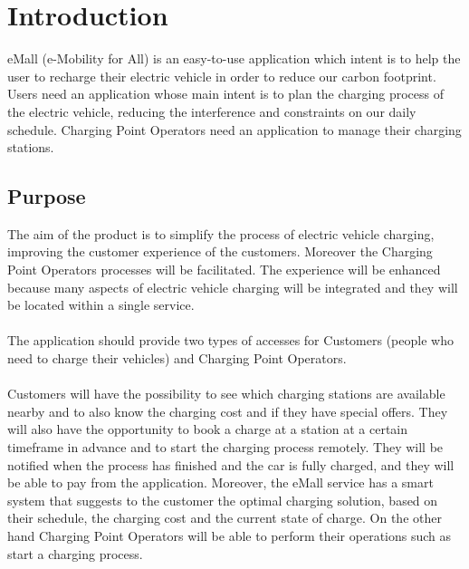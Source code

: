 \section{Introduction}
eMall (e-Mobility for All) is an easy-to-use application which intent is to help the user to recharge their electric vehicle in order to reduce our carbon footprint.
Users need an application whose main intent is to plan the charging process of the electric vehicle, reducing the interference and constraints on our daily schedule.
Charging Point Operators need an application to manage their charging stations. 
\subsection{Purpose}

The aim of the product is to simplify the process of electric vehicle charging, improving the customer experience of the customers. Moreover the Charging Point Operators processes will be facilitated.
The experience will be enhanced because many aspects of electric vehicle charging will be integrated and they will be located within a single service.
\\\\
The application should provide two types of accesses for Customers (people who need to charge their vehicles) and Charging Point Operators.
\\\\
Customers will have the possibility to see which charging stations are available nearby and to also know the charging cost and if they have special offers.
They will also have the opportunity to book a charge at a station at a certain timeframe in advance and to start the charging process remotely.
They will be notified when the process has finished and the car is fully charged, and they will be able to pay from the application.
Moreover, the eMall service has a smart system that suggests to the customer the optimal charging solution, based on their schedule, the charging cost and the current state of charge.
On the other hand Charging Point Operators will be able to perform their operations such as start a charging process.
